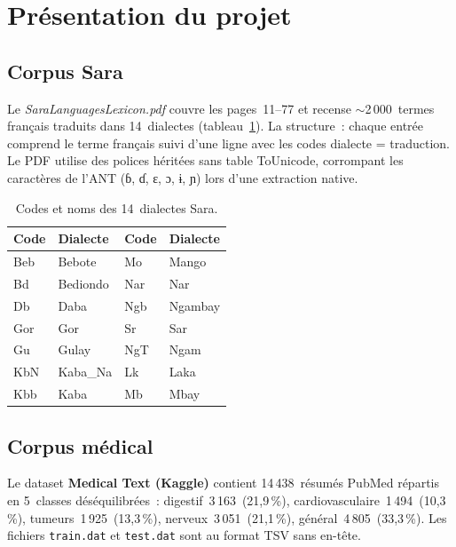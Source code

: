 \documentclass[11pt, a4paper, oneside]{article}
\begin{document}
\section{Présentation du projet}

\subsection{Corpus Sara}

Le \emph{SaraLanguagesLexicon.pdf} couvre les pages~11--77 et recense $\sim$2\,000~termes français traduits dans 14~dialectes (tableau~\ref{tab:dialectes}). La structure~: chaque entrée comprend le terme français suivi d'une ligne avec les codes dialecte = traduction. Le PDF utilise des polices héritées sans table ToUnicode, corrompant les caractères de l'ANT (ɓ, ɗ, ɛ, ɔ, ɨ, ɲ) lors d'une extraction native.

\begin{table}[H]
  \centering
  \caption{Codes et noms des 14~dialectes Sara.}
  \label{tab:dialectes}
  \small
  \begin{tabular}{llll}
    \toprule
    \textbf{Code} & \textbf{Dialecte} & \textbf{Code} & \textbf{Dialecte} \\
    \midrule
    Beb & Bebote & Mo & Mango \\
    Bd  & Bediondo & Nar & Nar \\
    Db  & Daba & Ngb & Ngambay \\
    Gor & Gor & Sr & Sar \\
    Gu  & Gulay & NgT & Ngam \\
    KbN & Kaba\_Na & Lk & Laka \\
    Kbb & Kaba & Mb & Mbay \\
    \bottomrule
  \end{tabular}
\end{table}

\subsection{Corpus médical}

Le dataset \textbf{Medical Text (Kaggle)} contient 14\,438~résumés PubMed répartis en 5~classes déséquilibrées~: digestif~3\,163~(21,9\,\%), cardiovasculaire~1\,494~(10,3\,\%), tumeurs~1\,925~(13,3\,\%), nerveux~3\,051~(21,1\,\%), général~4\,805~(33,3\,\%). Les fichiers \texttt{train.dat} et \texttt{test.dat} sont au format TSV sans en-tête.
\end{document}
